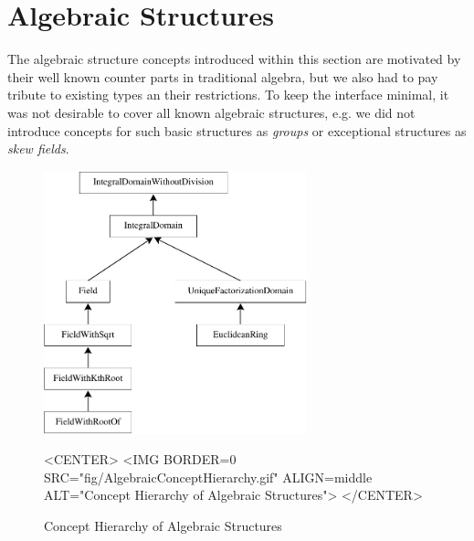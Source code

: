 
\section{Algebraic Structures}


The algebraic structure concepts introduced within this section are 
motivated by their well known counter parts in traditional algebra, 
but we also had to pay tribute to existing types an their restrictions. 
To keep the interface minimal,
it was not desirable to cover all known algebraic structures, 
e.g. we did not introduce concepts for such basic structures as {\em groups} or
exceptional structures as {\em skew fields}. 

\begin{figure}[htbp]
\begin{ccTexOnly}
\begin{center}
\includegraphics[width=3in]{Algebraic_foundations/fig/AlgebraicConceptHierarchy}
\end{center}
\end{ccTexOnly}
\caption{Concept Hierarchy of Algebraic Structures
\label{fig::ConceptHierarchyOfAlgebraicStructures}}

\begin{ccHtmlOnly}
<CENTER>
<IMG BORDER=0 SRC="fig/AlgebraicConceptHierarchy.gif" 
 ALIGN=middle ALT="Concept Hierarchy of Algebraic Structures">
</CENTER>
\end{ccHtmlOnly}
\end{figure}

